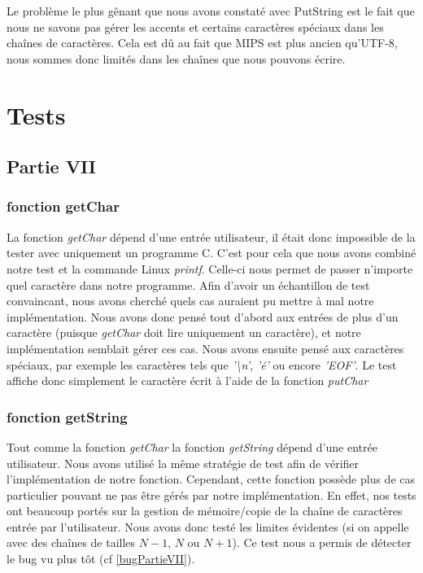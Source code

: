 \documentclass{article}
\begin{document}
Le problème le plus gênant que nous avons constaté avec PutString est le fait que nous ne savons pas gérer les accents et certains caractères spéciaux dans les chaînes de caractères.
Cela est dû au fait que MIPS est plus ancien qu'UTF-8, nous sommes donc limités dans les chaînes que nous pouvons écrire.
\section{Tests}

\subsection{Partie VII}
    \subsubsection{fonction getChar}
    La fonction \textit{getChar} dépend d'une entrée utilisateur, il était donc impossible de la tester avec uniquement
    un programme C. C'est pour cela que nous avons combiné notre test et la commande Linux \textit{printf}. Celle-ci
    nous permet de passer n'importe quel caractère dans notre programme. Afin d'avoir un échantillon de test convaincant,
    nous avons cherché quels cas auraient pu mettre à mal notre implémentation. Nous avons donc pensé tout d'abord aux entrées
    de plus d'un caractère (puisque \textit{getChar} doit lire uniquement un caractère), et notre implémentation semblait gérer ces cas.
    Nous avons ensuite pensé aux caractères spéciaux, par exemple les caractères tels que \textit{'\textbackslash n'}, \textit{'é'} ou encore \textit{'EOF'}.
    Le test affiche donc simplement le caractère écrit à l'aide de la fonction \textit{putChar}
    \subsubsection{fonction getString} 
    Tout comme la fonction \textit{getChar} la fonction \textit{getString} dépend d'une entrée utilisateur. Nous avons utilisé la même stratégie
    de test afin de vérifier l'implémentation de notre fonction. Cependant, cette fonction possède plus de cas particulier pouvant ne pas être gérés par notre implémentation.
    En effet, nos tests ont beaucoup portés sur la gestion de mémoire/copie de la chaîne de caractères entrée par l'utilisateur. Nous avons donc testé les limites évidentes
    (si on appelle avec des chaînes de tailles $N-1$, $N$ ou $N+1$). Ce test nous a permis de détecter le bug vu plus tôt (cf \ref{bugPartieVII}).
\end{document}
